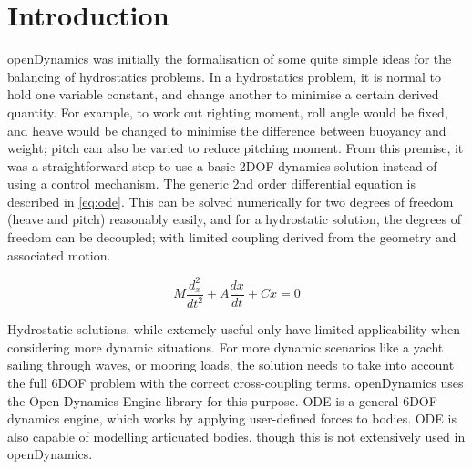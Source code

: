 \chapter{Introduction}
openDynamics was initially the formalisation of some quite simple ideas for the balancing of hydrostatics problems. In a hydrostatics problem, it is normal to hold one variable constant, and change another to minimise a certain derived quantity. For example, to work out righting moment, roll angle would be fixed, and heave would be changed to minimise the difference between buoyancy and weight; pitch can also be varied to reduce pitching moment. From this premise, it was a straightforward step to use a basic 2DOF dynamics solution instead of using a control mechanism. The generic 2nd order differential equation is described in \ref{eq:ode}. This can be solved numerically for two degrees of freedom (heave and pitch) reasonably easily, and for a hydrostatic solution, the degrees of freedom can be decoupled; with limited coupling derived from the geometry and associated motion.

\begin{equation}
M\frac{d^2_x}{dt^2} + A\frac{dx}{dt} + Cx = 0
\label{eq:ode}
\end{equation}

Hydrostatic solutions, while extemely useful only have limited applicability when considering more dynamic situations. For more dynamic scenarios like a yacht sailing through waves, or mooring loads, the solution needs to take into account the full 6DOF problem with the correct cross-coupling terms. openDynamics uses the Open Dynamics Engine library \cite{ODE} for this purpose. ODE is a general 6DOF dynamics engine, which works by applying user-defined forces to bodies. ODE is also capable of modelling articuated bodies, though this is not extensively used in openDynamics. 